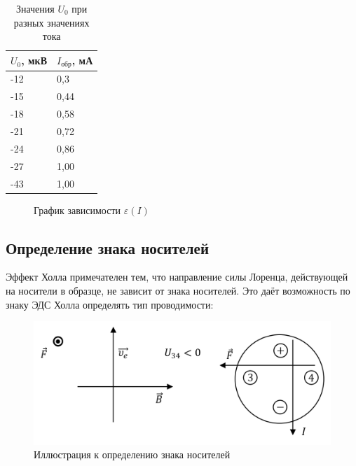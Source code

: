 \documentclass[a4paper, 12pt]{article}
\begin{document}
{\begin{table}[H]
\centering
\begin{tabular}{|l|l|}
\hline
\textbf{$U_0$, мкВ} & \textbf{$I_{\text{обр}}$, мА} \\ \hline
-12                 & 0,3                           \\ \hline
-15                 & 0,44                          \\ \hline
-18                 & 0,58                          \\ \hline
-21                 & 0,72                          \\ \hline
-24                 & 0,86                          \\ \hline
-27                 & 1,00                          \\ \hline
-43                 & 1,00                           \\ \hline
\end{tabular}
\caption{Значения $U_0$ при разных значениях тока}
\label{my-label}
\end{table}



\begin {figure}[H]
\begin{center}


\caption{График зависимости $\varepsilon(I)$}
\end{center}
\end {figure}

\subsection*{Определение знака носителей}
Эффект Холла примечателен тем, что направление силы Лоренца, действующей на носители в образце, не зависит от знака носителей. Это даёт возможность по знаку ЭДС Холла определять тип проводимости:

\begin{figure}[H]
\centering
\includegraphics[width = 16cm]{sign}
\caption{Иллюстрация к определению знака носителей}
\end{figure}

}
\end{document}

